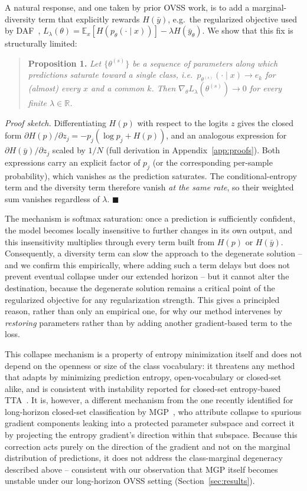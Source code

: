 A natural response, and one taken by prior OVSS work, is to add a
marginal-diversity term that explicitly rewards $H(\bar y)$, e.g.\ the
regularized objective used by DAF~\citep{doloriel2026daf},
$L_\lambda(\theta) = \mathbb{E}_x[H(p_\theta(\cdot\mid x))] - \lambda H(\bar
y_\theta)$. We show that this fix is structurally limited:

\begin{quote}
\textbf{Proposition 1.} \textit{Let $\{\theta^{(s)}\}$ be a sequence of
parameters along which predictions saturate toward a single class, i.e.\
$p_{\theta^{(s)}}(\cdot\mid x) \to e_k$ for (almost) every $x$ and a common
$k$. Then $\nabla_\theta L_\lambda(\theta^{(s)}) \to 0$ for every finite
$\lambda \in \mathbb{R}$.}
\end{quote}

\emph{Proof sketch.} Differentiating $H(p)$ with respect to the logits $z$
gives the closed form $\partial H(p)/\partial z_j = -p_j(\log p_j + H(p))$,
and an analogous expression for $\partial H(\bar y)/\partial z_j$ scaled by
$1/N$ (full derivation in Appendix~\ref{app:proofs}). Both expressions carry
an explicit factor of $p_j$ (or the corresponding per-sample probability),
which vanishes as the prediction saturates. The conditional-entropy term and
the diversity term therefore vanish \emph{at the same rate}, so their
weighted sum vanishes regardless of $\lambda$. $\blacksquare$

The mechanism is softmax saturation: once a prediction is sufficiently
confident, the model becomes locally insensitive to further changes in its
own output, and this insensitivity multiplies through every term built from
$H(p)$ or $H(\bar y)$. Consequently, a diversity term can slow the approach
to the degenerate solution -- and we confirm this empirically, where adding
such a term delays but does not prevent eventual collapse under our extended
horizon -- but it cannot alter the destination, because the degenerate
solution remains a critical point of the regularized objective for any
regularization strength. This gives a principled reason, rather than only an
empirical one, for why our method intervenes by \emph{restoring} parameters
rather than by adding another gradient-based term to the loss.

This collapse mechanism is a property of entropy minimization itself and does
not depend on the openness or size of the class vocabulary: it threatens any
method that adapts by minimizing prediction entropy, open-vocabulary or
closed-set alike, and is consistent with instability reported for
closed-set entropy-based TTA~\citep{niu2023sar}. It is, however, a different
mechanism from the one recently identified for long-horizon closed-set
classification by MGP~\citep{xiong2026mgp}, who attribute collapse to
spurious gradient components leaking into a protected parameter subspace and
correct it by projecting the entropy gradient's direction within that
subspace. Because this correction acts purely on the direction of the
gradient and not on the marginal distribution of predictions, it does not
address the class-marginal degeneracy described above -- consistent with our
observation that MGP itself becomes unstable under our long-horizon OVSS
setting (Section~\ref{sec:results}).

